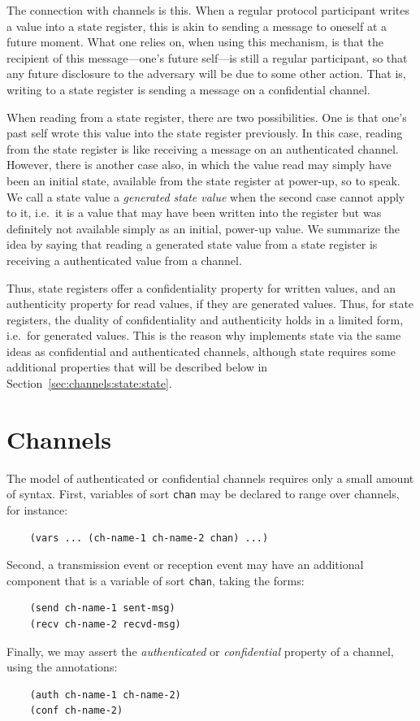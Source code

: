 The connection with channels is this.  When a regular protocol
participant writes a value into a state register, this is akin to
sending a message to oneself at a future moment.  What one relies on,
when using this mechanism, is that the recipient of this
message---one's future self---is still a regular participant, so that
any future disclosure to the adversary will be due to some other
action.  That is, writing to a state register is sending a message on
a confidential channel.

When reading from a state register, there are two possibilities.  One
is that one's past self wrote this value into the state register
previously.  In this case, reading from the state register is like
receiving a message on an authenticated channel.  However, there is
another case also, in which the value read may simply have been an
initial state, available from the state register at power-up, so to
speak.  We call a state value a \emph{generated state value} when the
second case cannot apply to it, i.e.~it is a value that may have been
written into the register but was definitely not available simply as
an initial, power-up value.  We summarize the idea by saying that
reading a generated state value from a state register is receiving a
authenticated value from a channel.

Thus, state registers offer a confidentiality property for written
values, and an authenticity property for read values, if they are
generated values.  Thus, for state registers, the duality of
confidentiality and authenticity holds in a limited form, i.e.~for
generated values.  This is the reason why {\cpsa} implements state via
the same ideas as confidential and authenticated channels, although
state requires some additional properties that will be described below
in Section~\ref{sec:channels:state:state}.

\section{Channels}
\label{sec:channels:state:ch}

The {\cpsa} model of authenticated or confidential channels requires
only a small amount of syntax.  First, variables of sort \verb|chan|
may be declared to range over channels, for instance:
%
\begin{verbatim}
    (vars ... (ch-name-1 ch-name-2 chan) ...)
\end{verbatim}
%
Second, a transmission event or reception event may have an additional
component that is a variable of sort \verb|chan|, taking the forms:
%
\begin{verbatim}
    (send ch-name-1 sent-msg)
    (recv ch-name-2 recvd-msg)
\end{verbatim}
%
Finally, we may assert the \emph{authenticated} or \emph{confidential}
property of a channel, using the annotations:
%
\begin{verbatim}
    (auth ch-name-1 ch-name-2)
    (conf ch-name-2)
\end{verbatim}
%


